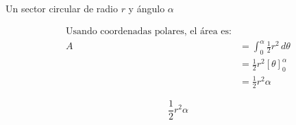 Un sector circular de radio $r$ y ángulo $\alpha$

\nopagebreak
\begin{align*}
\text{Usando coordenadas polares, el área es:} \\
A &= \int_{0}^{\alpha} \frac{1}{2} r^2 \, d\theta \\
&= \frac{1}{2} r^2 [\theta]_{0}^{\alpha} \\
&= \frac{1}{2} r^2 \alpha
\end{align*}

\[
\boxed{\displaystyle \frac{1}{2} r^2 \alpha}
\]
